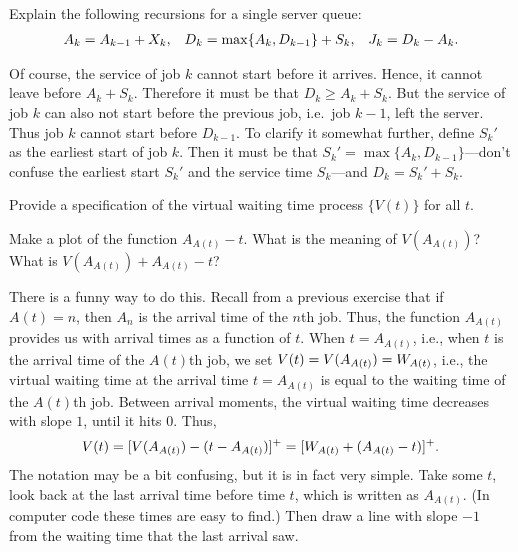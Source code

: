 \begin{exercise}\label{ex:l-149}
Explain  the following recursions for a single server queue:
\begin{align*}
 A_k &= A_{k-1} + X_k, &  D_k &= \max\{A_k, D_{k-1}\} + S_k, &  J_k = D_k - A_k.
 \end{align*}
\begin{solution}
  Of course, the service of job $k$ cannot start before it arrives.
  Hence, it cannot leave before $A_k + S_k$.
  Therefore it must be that $D_k \geq A_k +S_k$.
  But the service of job $k$ can also not start before the previous job, i.e.\ job $k-1$, left the server.
  Thus job $k$ cannot start before $D_{k-1}$.
  To clarify it somewhat further, define $S_k'$ as the earliest start of job $k$.
  Then it must be that $S_k' = \max\{A_k, D_{k-1}\}$---don't confuse the earliest start $S_k'$ and the service time $S_k$---and $D_k = S_k' + S_k$.
\end{solution}
\end{exercise}



\begin{exercise}\label{ex:l-150}
 Provide a specification of the virtual waiting time process $\{V(t)\}$ for
 all $t$.
\begin{hint}Make a plot of the function $A_{A(t)}-t$. What is the meaning of $V(A_{A(t)})$? What is
$V(A_{A(t)}) + A_{A(t)}-t$?
\end{hint}
\begin{solution}
 There is a funny way to do this.
 Recall from a previous exercise that if $A(t)=n$, then $A_n$ is the arrival time of the $n$th job.
 Thus, the function $A_{A(t)}$ provides us with arrival times as a function of $t$.
 When $t=A_{A(t)}$, i.e., when $t$ is the arrival time of the $A(t)$th job, we set $V(t) = V(A_{A(t)}) = W_{A(t)}$, i.e., the virtual waiting time at the arrival time $t=A_{A(t)}$ is equal to the waiting time of the $A(t)$th job.
 Between arrival moments, the virtual waiting time decreases with slope $1$, until it hits 0.
 Thus,
 \begin{equation*}
 V(t)
= [V(A_{A(t)}) - (t-A_{A(t)})]^+= [W_{A(t)} + (A_{A(t)}-t)]^+.
 \end{equation*}
 The notation may be a bit confusing, but it is in fact very simple.
 Take some $t$, look back at the last arrival time before time $t$, which is written as $A_{A(t)}$.
 (In computer code these times are easy to find.)
 Then draw a line with slope $-1$ from the waiting time that the last arrival saw.
\end{solution}
\end{exercise}



